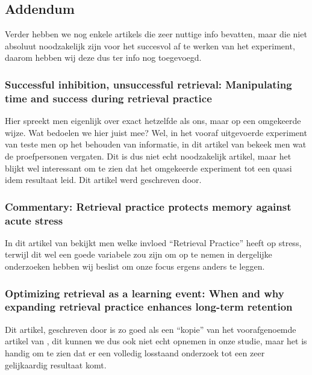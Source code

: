 \documentclass[12pt,a4paper]{article}
\begin{document}
        \subsection{Addendum}
        
        Verder hebben we nog enkele artikels die zeer nuttige info bevatten, maar die niet absoluut noodzakelijk zijn voor het succesvol af te werken van het experiment, daarom hebben wij deze dus ter info nog toegevoegd.
        
        \subsubsection{Successful inhibition, unsuccessful retrieval: Manipulating time and success during retrieval practice}
        
        Hier spreekt men eigenlijk over exact hetzelfde als ons, maar op een omgekeerde wijze. Wat bedoelen we hier juist mee? Wel, in het vooraf uitgevoerde experiment van \cite{HenryRoediger2006} teste men op het behouden van informatie, in dit artikel van \cite{BenjaminStorm2009} bekeek men wat de proefpersonen vergaten. Dit is dus niet echt noodzakelijk artikel, maar het blijkt wel interessant om te zien dat het omgekeerde experiment tot een quasi idem resultaat leid. Dit artikel werd geschreven door. 
        
        \subsubsection{Commentary: Retrieval practice protects memory against acute stress}
        
        In dit artikel van \cite{Smith2016} bekijkt men welke invloed ``Retrieval Practice'' heeft op stress, terwijl dit wel een goede variabele zou zijn om op te nemen in dergelijke onderzoeken hebben wij beslist om onze focus ergens anders te leggen.
        
        \subsubsection{Optimizing retrieval as a learning event: When and why expanding retrieval practice enhances long-term retention}
        
        Dit artikel, geschreven door \cite{Storm2010} is zo goed als een ``kopie'' van het voorafgenoemde artikel van \cite{HenryRoediger2006}, dit kunnen we dus ook niet echt opnemen in onze studie, maar het is handig om te zien dat er een volledig losstaand onderzoek tot een zeer gelijkaardig resultaat komt. 
        
\end{document}

